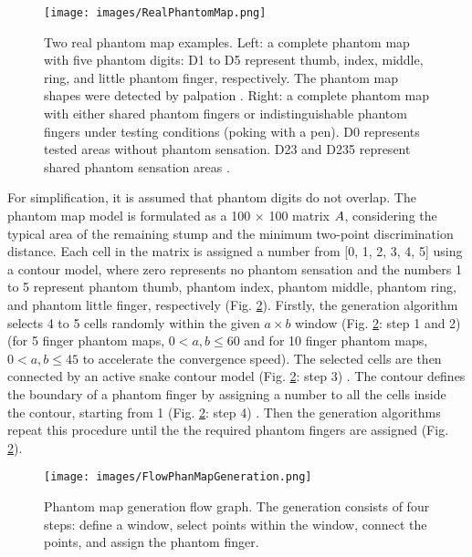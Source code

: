 \begin{figure}[htp]
    \centering
    \texttt{[image: images/RealPhantomMap.png]}
    \caption{Two real phantom map examples.  Left: a complete phantom map with five phantom digits: D1 to D5 represent thumb, index, middle, ring, and little phantom finger, respectively.  The phantom map shapes were detected by palpation \cite{antfolk2012sensory}.  Right: a complete phantom map with either shared phantom fingers or indistinguishable phantom fingers under testing conditions (poking with a pen).  D0 represents tested areas without phantom sensation. D23 and D235 represent shared phantom sensation areas \cite{zhang2015somatotopical}.}
    \label{fig:RealPhantomMaps}
\end{figure}

For simplification, it is assumed that phantom digits do not overlap. The phantom map model is formulated as a 100 $\times$ 100 matrix $\boldmath{A}$, considering the typical area of the remaining stump and the minimum two-point discrimination distance. Each cell in the matrix is assigned a number from [0, 1, 2, 3, 4, 5] using a contour model, where zero represents no phantom sensation and the numbers 1 to 5 represent phantom thumb, phantom index, phantom middle, phantom ring, and phantom little finger, respectively (Fig. \ref{Fig:FlowPhanMapGeneration}). Firstly, the generation algorithm selects 4 to 5 cells randomly within the given $a \times b$ window (Fig. \ref{Fig:FlowPhanMapGeneration}: step 1 and 2) (for 5 finger phantom maps, $0 < a,b \leq 60$ and for 10 finger phantom maps, $0 < a,b \leq 45$ to accelerate the convergence speed). The selected cells are then connected by an active snake contour model (Fig. \ref{Fig:FlowPhanMapGeneration}: step 3) \cite{kass1988snakes}. The contour defines the boundary of a phantom finger by assigning a number to all the cells inside the contour, starting from 1  (Fig. \ref{Fig:FlowPhanMapGeneration}: step 4) . Then the generation algorithms repeat this procedure until the the required phantom fingers are assigned (Fig. \ref{Fig:FlowPhanMapGeneration}). 

\begin{figure}[htb]
    \centering
    \texttt{[image: images/FlowPhanMapGeneration.png]}
    \caption{Phantom map generation flow graph. The generation consists of four steps: define a window, select points within the window, connect the points, and assign the phantom finger.}
    \label{Fig:FlowPhanMapGeneration}
\end{figure}

